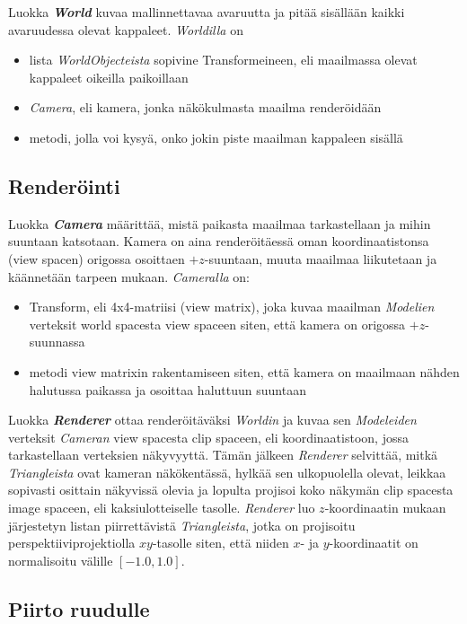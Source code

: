 \documentclass[12pt] {article}
\begin{document}
Luokka \textit{\textbf{World}} kuvaa mallinnettavaa avaruutta ja pitää sisällään kaikki avaruudessa olevat kappaleet. \textit{Worldilla} on
\begin{itemize}
	\item lista \textit{WorldObjecteista} sopivine Transformeineen, eli maailmassa olevat kappaleet oikeilla paikoillaan
	\item \textit{Camera}, eli kamera, jonka näkökulmasta maailma renderöidään
	\item metodi, jolla voi kysyä, onko jokin piste maailman kappaleen sisällä
\end{itemize}

\subsection {Renderöinti}

Luokka \textit{\textbf{Camera}} määrittää, mistä paikasta maailmaa tarkastellaan ja mihin suuntaan katsotaan. Kamera on aina renderöitäessä oman koordinaatistonsa (view spacen) origossa osoittaen $+z$-suuntaan, muuta maailmaa liikutetaan ja käännetään tarpeen mukaan. \textit{Cameralla} on:
\begin{itemize}
	\item Transform, eli 4x4-matriisi (view matrix), joka kuvaa maailman \textit{Modelien} verteksit world spacesta view spaceen siten, että kamera on origossa $+z$-suunnassa
	\item metodi view matrixin rakentamiseen siten, että kamera on maailmaan nähden halutussa paikassa ja osoittaa haluttuun suuntaan
\end{itemize}

Luokka \textit{\textbf{Renderer}} ottaa renderöitäväksi \textit{Worldin} ja kuvaa sen \textit{Modeleiden} verteksit \textit{Cameran} view spacesta clip spaceen, eli koordinaatistoon, jossa tarkastellaan verteksien näkyvyyttä. Tämän jälkeen \textit{Renderer} selvittää, mitkä \textit{Triangleista} ovat kameran näkökentässä, hylkää sen ulkopuolella olevat, leikkaa sopivasti osittain näkyvissä olevia ja lopulta projisoi koko näkymän clip spacesta image spaceen, eli kaksiulotteiselle tasolle. \textit{Renderer} luo $z$-koordinaatin mukaan järjestetyn listan piirrettävistä \textit{Triangleista}, jotka on projisoitu perspektiiviprojektiolla $xy$-tasolle siten, että niiden $x$- ja $y$-koordinaatit on normalisoitu välille $[-1.0, 1.0]$.

\subsection {Piirto ruudulle}
\end{document}
